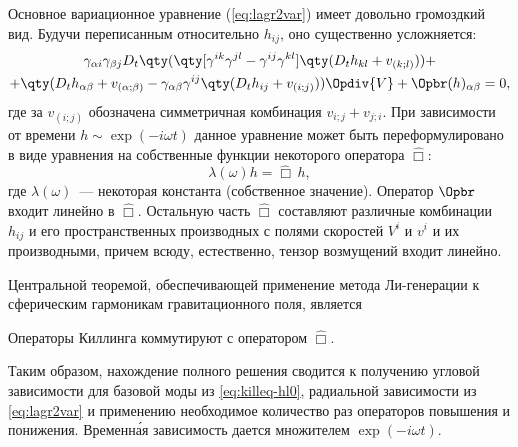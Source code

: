 \documentclass[\docroot/reports/draft/report.tex]{subfiles}
\begin{document}
\label{sec:lie-generation}

    Основное вариационное уравнение (\autoref{eq:lagr2var}) имеет довольно громоздкий вид. Будучи переписанным относительно $h_{ij}$, оно существенно усложняется:
    \begin{equation}\label{eq:lagr2var-hij}
        \begin{gathered}
            \gamma_{\alpha i}\gamma_{\beta j} D_t\qty(\qty[\gamma^{ik}\gamma^{jl} - \gamma^{ij}\gamma^{kl}] \qty(D_t{h_{kl}} + v_{(k;l)})) + \\ + \qty(D_t{h_{\alpha\beta}} + v_{(\alpha;\beta)} - \gamma_{\alpha\beta}\gamma^{ij}\qty(D_t{h_{ij}} + v_{(i;j)})) \Opdiv{V} + \Opbr(h)_{\alpha\beta} = 0 ,
        \end{gathered}
    \end{equation}
    где за $v_{(i;j)}$ обозначена симметричная комбинация $v_{i;j} + v_{j;i}$. При зависимости от времени $h\sim\exp(-i\omega t)$ данное уравнение может быть переформулировано в виде уравнения на собственные функции некоторого оператора $\hat{\Box}$:
    \begin{equation*}
        \lambda(\omega) h = \hat{\Box}\, h ,
    \end{equation*}
    где $\lambda(\omega)$~--- некоторая константа (собственное значение). Оператор $\Opbr$ входит линейно в $\hat{\Box}$. Остальную часть $\hat{\Box}$ составляют различные комбинации $h_{ij}$ и его пространственных производных с полями скоростей $V^i$ и $v^i$ и их производными, причем всюду, естественно, тензор возмущений входит линейно.

    Центральной теоремой, обеспечивающей применение метода Ли-генерации к сферическим гармоникам гравитационного поля, является
    \begin{theorem}
        Операторы Киллинга коммутируют с оператором $\hat{\Box}$.
    \end{theorem}

    Таким образом, нахождение полного решения сводится к получению угловой зависимости для базовой моды из \autoref{eq:killeq-hl0}, радиальной зависимости из \autoref{eq:lagr2var} и применению необходимое количество раз операторов повышения и понижения. Временн\'{а}я зависимость дается множителем $\exp(-i \omega t)$.
\end{document}
